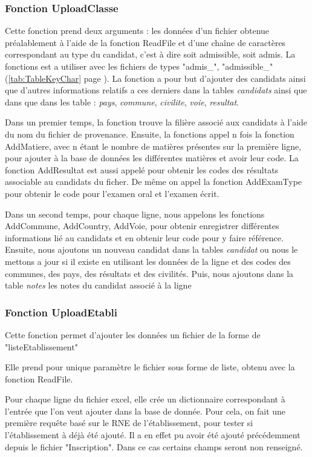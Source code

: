 \subsubsection{Fonction UploadClasse}


Cette fonction prend deux arguments : les données d'un fichier obtenue préalablement à l'aide de la fonction ReadFile et d'une chaîne de caractères  correspondant au type du candidat, c'est à dire soit admissible, soit admis. La fonctions est a utiliser avec les fichiers  de types "admis\_", "admissible\_" (\ref{tab:TableKeyChar} page \pageref{tab:TableKeyChar}).
La fonction a pour but d'ajouter des candidats ainsi que d'autres informations relatifs a ces derniers dans la tables \textit{candidats} ainsi que dans que dans les table : \textit{pays}, \textit{commune}, \textit{civilite}, \textit{voie}, \textit{resultat}.

Dans un premier temps, la fonction trouve la filière associé aux candidats à l'aide du nom du fichier de provenance.
Ensuite, la fonctions appel n fois la fonction AddMatiere, avec n étant le nombre de matières présentes sur la première ligne, pour ajouter à la base de données les différentes matières et avoir leur code.
La fonction AddResultat est aussi appelé pour obtenir les codes des résultats associable au candidats du ficher. De même on appel la fonction AddExamType pour obtenir le code pour l'examen oral et l'examen écrit.

Dans un second temps, pour chaque ligne, nous appelons les fonctions AddCommune, AddCountry, AddVoie, pour obtenir enregistrer différentes informations lié au candidats et en obtenir leur code pour y faire référence.
Ensuite, nous ajoutons un nouveau candidat dans la tables \textit{candidat} ou nous le mettons a jour si il existe en utilisant les données de la ligne et des codes des communes, des pays, des résultats et des civilités. Puis, nous ajoutons dans la table \textit{notes} les notes du candidat associé à la ligne


\subsubsection{Fonction UploadEtabli}

Cette fonction permet d'ajouter les données un fichier de la forme de "listeEtablissement"

Elle prend pour unique paramètre le fichier sous forme de liste, obtenu avec la fonction ReadFile.


Pour chaque ligne du fichier excel, elle crée un dictionnaire correspondant à l'entrée que l'on veut ajouter dans la base de donnée. Pour cela, on fait une première requête basé sur le RNE de l'établissement, pour tester si l'établissement à déjà été ajouté. Il a en effet pu avoir été ajouté précédemment depuis le fichier "Inscription". Dans ce cas certains champs seront non renseigné.

